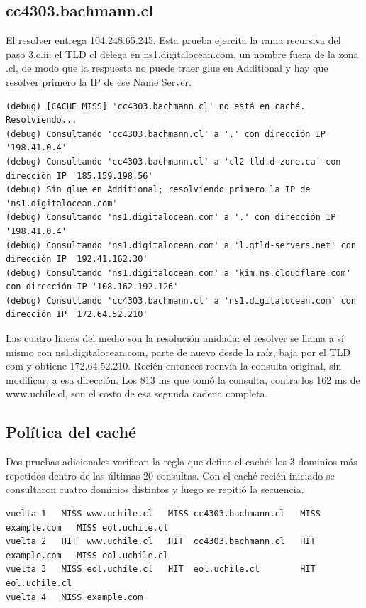 \documentclass[
	spanish, %
	letterpaper, oneside
]{article}
\begin{document}
\subsection{cc4303.bachmann.cl}
El resolver entrega 104.248.65.245. Esta prueba ejercita la rama recursiva del paso 3.c.ii: el TLD cl delega en ns1.digitalocean.com, un nombre fuera de la zona .cl, de modo que la respuesta no puede traer glue en Additional y hay que resolver primero la IP de ese Name Server.

{\scriptsize
\begin{verbatim}
(debug) [CACHE MISS] 'cc4303.bachmann.cl' no está en caché. Resolviendo...
(debug) Consultando 'cc4303.bachmann.cl' a '.' con dirección IP '198.41.0.4'
(debug) Consultando 'cc4303.bachmann.cl' a 'cl2-tld.d-zone.ca' con dirección IP '185.159.198.56'
(debug) Sin glue en Additional; resolviendo primero la IP de 'ns1.digitalocean.com'
(debug) Consultando 'ns1.digitalocean.com' a '.' con dirección IP '198.41.0.4'
(debug) Consultando 'ns1.digitalocean.com' a 'l.gtld-servers.net' con dirección IP '192.41.162.30'
(debug) Consultando 'ns1.digitalocean.com' a 'kim.ns.cloudflare.com' con dirección IP '108.162.192.126'
(debug) Consultando 'cc4303.bachmann.cl' a 'ns1.digitalocean.com' con dirección IP '172.64.52.210'
\end{verbatim}
}

Las cuatro líneas del medio son la resolución anidada: el resolver se llama a sí mismo con ns1.digitalocean.com, parte de nuevo desde la raíz, baja por el TLD com y obtiene 172.64.52.210. Recién entonces reenvía la consulta original, sin modificar, a esa dirección. Los 813 ms que tomó la consulta, contra los 162 ms de www.uchile.cl, son el costo de esa segunda cadena completa.

\subsection{Política del caché}
Dos pruebas adicionales verifican la regla que define el caché: los 3 dominios más repetidos dentro de las últimas 20 consultas. Con el caché recién iniciado se consultaron cuatro dominios distintos y luego se repitió la secuencia.

{\scriptsize
\begin{verbatim}
vuelta 1   MISS www.uchile.cl   MISS cc4303.bachmann.cl   MISS example.com   MISS eol.uchile.cl
vuelta 2   HIT  www.uchile.cl   HIT  cc4303.bachmann.cl   HIT  example.com   MISS eol.uchile.cl
vuelta 3   MISS eol.uchile.cl   HIT  eol.uchile.cl        HIT  eol.uchile.cl
vuelta 4   MISS example.com
\end{verbatim}
}
\end{document}
